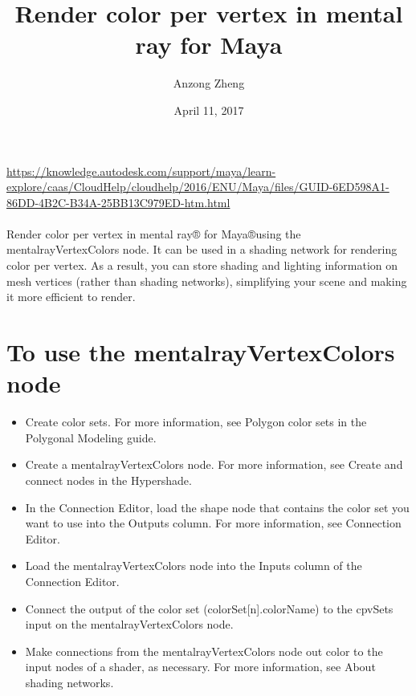 \documentclass[10pt,a4paper]{article}
\begin{document}
\author{Anzong Zheng}
\title{Render color per vertex in mental ray for Maya}
\date{April 11, 2017}
\maketitle


\newpage\clearpage\setcounter{page}{1}

\url{https://knowledge.autodesk.com/support/maya/learn-explore/caas/CloudHelp/cloudhelp/2016/ENU/Maya/files/GUID-6ED598A1-86DD-4B2C-B34A-25BB13C979ED-htm.html}
\\
\\
Render color per vertex in mental ray® for Maya®using the mentalrayVertexColors node. It can be used in a shading network for rendering color per vertex. As a result, you can store shading and lighting information on mesh vertices (rather than shading networks), simplifying your scene and making it more efficient to render.

\section*{To use the mentalrayVertexColors node}

\begin{itemize}
	\item Create color sets. For more information, see Polygon color sets in the Polygonal Modeling guide.
	\item Create a mentalrayVertexColors node. For more information, see Create and connect nodes in the Hypershade.
	\item In the Connection Editor, load the shape node that contains the color set you want to use into the Outputs column. For more information, see Connection Editor.
	\item Load the mentalrayVertexColors node into the Inputs column of the Connection Editor.
	\item Connect the output of the color set (colorSet[n].colorName) to the cpvSets input on the mentalrayVertexColors node.
	\item Make connections from the mentalrayVertexColors node out color to the input nodes of a shader, as necessary. For more information, see About shading networks.
\end{itemize}
\end{document}
